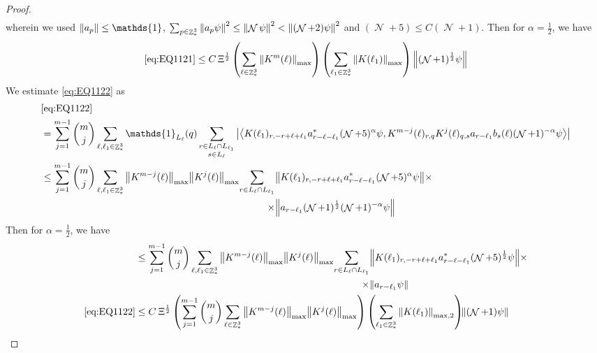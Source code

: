 \documentclass[sn-mathphys, Numbered ,a4paper]{sn-jnl}%
\DeclareMathOperator{\Z}{\mathbb{Z}}
\DeclareMathOperator{\NN}{\mathcal{N}}
\newcommand{\half}{\frac{1}{2}}
\newcommand{\eva}[1]{\left\langle #1 \right\rangle}
\theoremstyle{plain}
\theoremstyle{definition}
\theoremstyle{remark}
\theoremstyle{plain}
\theoremstyle{definition}
\theoremstyle{remark}
\begin{document}
\begin{proof}
\begin{align}
\end{align}
wherein we used $\norm{a_p} \leq \mathds{1}$, $\sum_{p\in \Z^3_*}\norm{a_p \psi}^2\leq\norm{\NN\psi}^2<\norm{(\NN+2)\psi}^2$ and $(\NN+5)\leq C(\NN+1)$. Then for $\alpha = \half$, we have
\begin{equation}
	\eqref{eq:EQ1121}\leq C\, \Xi^\half \left(\sum\limits_{\ell\in \Z^3_*} \norm{K^m(\ell )}_{\mathrm{max}}\right) \left(\sum\limits_{\ell_1\in \Z^3_*} \norm{K(\ell_1)}_{\mathrm{max}} \right)\norm{(\NN+1)^{\half} \psi}\label{eq:estEQ1121}
\end{equation}
We estimate \eqref{eq:EQ1122} as
\begin{align}
	&\eqref{eq:EQ1122}\nonumber\\
	&= \sum\limits_{j=1}^{m-1} {{m}\choose j}\sum\limits_{\ell, \ell_1\in \Z^3_*} \mathds{1}_{L_{\ell}}(q) \sum\limits_{\substack{r\in L_{\ell} \cap L_{\ell_1}\\s\in L_{\ell}}} \abs{\eva{ K(\ell_1)_{r,-r+\ell+\ell_1} a^*_{r-\ell-\ell_1} (\NN+5)^{\alpha} \psi,  K^{m-j}(\ell)_{r,q} K^{j}(\ell)_{q,s} a_{r-\ell_1} b_{s}(\ell)  (\NN+1)^{-\alpha} \psi }}\nonumber\\
	&\leq  \sum\limits_{j=1}^{m-1} {{m}\choose j}\sum\limits_{\ell, \ell_1\in \Z^3_*} \norm{K^{m-j}(\ell)}_{\mathrm{max}} \norm{ K^{j}(\ell)}_{\mathrm{max}}\begin{aligned}[t]
		 \sum\limits_{r\in L_{\ell} \cap L_{\ell_1}} &\norm{ K(\ell_1)_{r,-r+\ell+\ell_1} a^*_{r-\ell-\ell_1} (\NN+5)^{\alpha} \psi}\times\\ \times &\norm{a_{r-\ell_1} (\NN+1)^{\half} (\NN+1)^{-\alpha} \psi}
	 \end{aligned}\nonumber
\end{align}
Then for $\alpha = \half$, we have
\begin{align}
	&\leq  \sum\limits_{j=1}^{m-1} {{m}\choose j}\sum\limits_{\ell, \ell_1\in \Z^3_*} \norm{K^{m-j}(\ell)}_{\mathrm{max}} \norm{ K^{j}(\ell)}_{\mathrm{max}}\begin{aligned}[t]
	\sum\limits_{r\in L_{\ell} \cap L_{\ell_1}} &\norm{ K(\ell_1)_{r,-r+\ell+\ell_1} a^*_{r-\ell-\ell_1} (\NN+5)^{\half} \psi}\times\\ \times &\norm{a_{r-\ell_1} \psi}
	\end{aligned}\nonumber\\
	\eqref{eq:EQ1122}&\leq C \: \Xi^\half \left(  \sum\limits_{j=1}^{m-1} {{m}\choose j} \sum\limits_{\ell \in \Z^3_*} \norm{K^{m-j}(\ell)}_{\mathrm{max}} \norm{ K^{j}(\ell)}_{\mathrm{max}}\right) \left( \sum\limits_{ \ell_1\in \Z^3_*}\norm{ K(\ell_1) }_{\mathrm{max},2} \right)\!\! \norm{(\NN+1) \psi } \label{eq:estEQ1122}

\end{align}
\end{proof}
\end{document}
